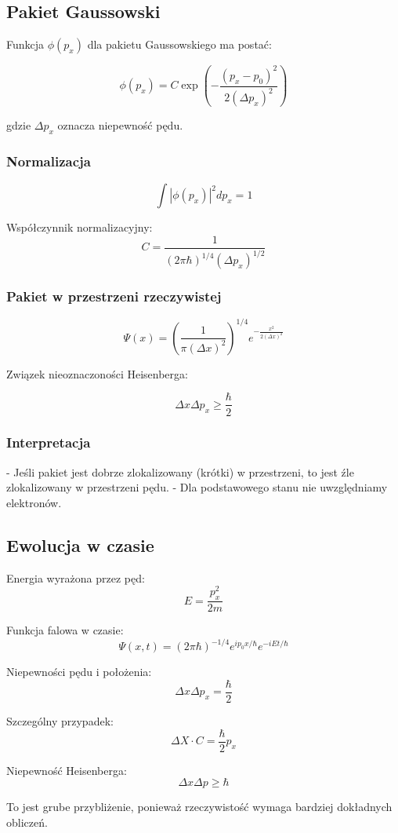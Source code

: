 \subsection{Pakiet Gaussowski}
Funkcja $\phi(p_x)$ dla pakietu Gaussowskiego ma postać:

\[
\phi(p_x) = C \exp \left( -\frac{(p_x - p_0)^2}{2 (\Delta p_x)^2} \right)
\]

gdzie $\Delta p_x$ oznacza niepewność pędu.

\subsubsection{Normalizacja}
\[
\int |\phi(p_x)|^2 dp_x = 1
\]

Współczynnik normalizacyjny:
\[
C = \frac{1}{(2\pi\hbar)^{1/4} (\Delta p_x)^{1/2}}
\]

\subsubsection{Pakiet w przestrzeni rzeczywistej}
\[
\Psi(x) = \left( \frac{1}{\pi (\Delta x)^2} \right)^{1/4} e^{-\frac{x^2}{2 (\Delta x)^2}}
\]

Związek nieoznaczoności Heisenberga:

\[
\Delta x \Delta p_x \geq \frac{\hbar}{2}
\]

\subsubsection{Interpretacja}
- Jeśli pakiet jest dobrze zlokalizowany (krótki) w przestrzeni, to jest źle zlokalizowany w przestrzeni pędu.
- Dla podstawowego stanu nie uwzględniamy elektronów.

\subsection{Ewolucja w czasie}

Energia wyrażona przez pęd:
\[
E = \frac{p_x^2}{2m}
\]

Funkcja falowa w czasie:
\[
\Psi(x,t) = (2\pi\hbar)^{-1/4} e^{i p_0 x / \hbar} e^{-i E t / \hbar}
\]

Niepewności pędu i położenia:
\[
\Delta x \Delta p_x = \frac{\hbar}{2}
\]

Szczególny przypadek:
\[
\Delta X \cdot C = \frac{\hbar}{2} p_x
\]

Niepewność Heisenberga:
\[
\Delta x \Delta p \geq \hbar
\]

To jest grube przybliżenie, ponieważ rzeczywistość wymaga bardziej dokładnych obliczeń.

